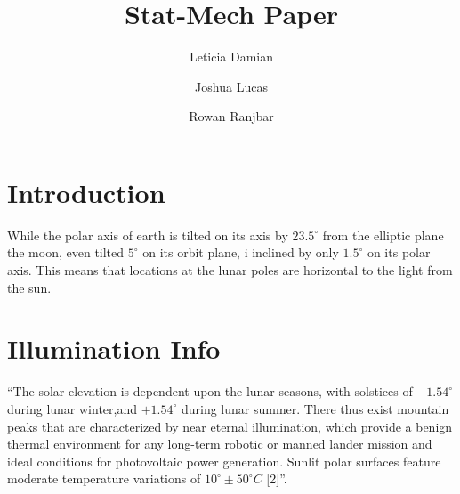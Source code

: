 \documentclass[prl,twocolumn]{revtex4-1}  %
\begin{document}

\title{ Stat-Mech Paper }
\author{Leticia Damian }
\author{Joshua Lucas}
\author{Rowan Ranjbar}







\begin{abstract}

\end{abstract}
 

\maketitle %

\section{Introduction}

While the polar axis of earth is tilted on its axis by $23.5^{\circ}$ from the elliptic plane the moon, even tilted $5^{\circ}$ on its orbit plane, i inclined by only $1.5^{\circ}$ on its polar axis\citep{Koebel}. This means that locations at the lunar poles are horizontal to the light from the sun. 

\section*{Illumination Info}
``The solar elevation is dependent upon the lunar seasons, with solstices of $-1.54^{\circ}$ during lunar winter,and $+1.54^{\circ}$ during lunar summer. There thus exist mountain peaks that are characterized by near eternal illumination, which provide a benign thermal environment for any long-term robotic or manned lander mission and ideal conditions for photovoltaic power generation. Sunlit polar surfaces feature moderate temperature variations of $10^{\circ} \pm 50^{\circ}C$ [2]''\citep{Koebel}.
\end{document}
